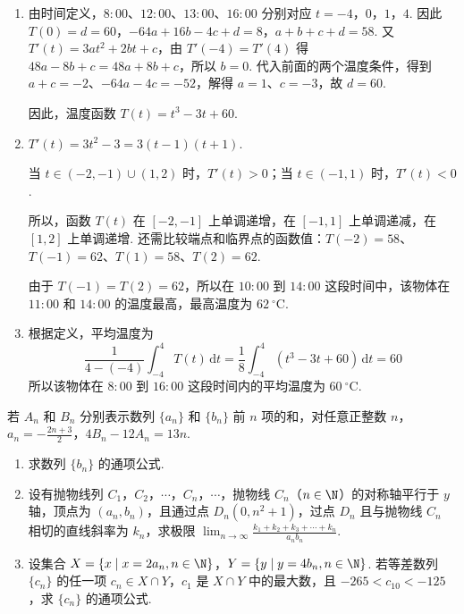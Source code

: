 \begin{solution}
\begin{enumerate}
\item 由时间定义，\(8{:}00\)、\(12{:}00\)、\(13{:}00\)、\(16{:}00\) 分别对应 \(t=-4\)，\(0\)，\(1\)，\(4\). 因此
\(T(0)=d=60\)，\(-64a+16b-4c+d=8\)，\(a+b+c+d=58\). 又 \(T'(t)=3at^2+2bt+c\)，由 \(T'(-4)=T'(4)\) 得 \(48a-8b+c=48a+8b+c\)，所以 \(b=0\). 代入前面的两个温度条件，得到 \(a+c=-2\)、\(-64a-4c=-52\)，解得 \(a=1\)、\(c=-3\)，故 \(d=60\).

因此，温度函数 \(T(t)=t^{3}-3t+60\).

\item \(T'(t)=3t^{2}-3=3(t-1)(t+1)\).

当 \(t\in(-2,-1)\cup(1,2)\) 时，\(T'(t)>0\)；当 \(t\in(-1,1)\) 时，\(T'(t)<0\).

所以，函数 \(T(t)\) 在 \([-2,-1]\) 上单调递增，在 \([-1,1]\) 上单调递减，在 \([1,2]\) 上单调递增. 还需比较端点和临界点的函数值：\(T(-2)=58\)、\(T(-1)=62\)、\(T(1)=58\)、\(T(2)=62\).

由于 \(T(-1)=T(2)=62\)，所以在 \(10{:}00\) 到 \(14{:}00\) 这段时间中，该物体在 \(11{:}00\) 和 \(14{:}00\) 的温度最高，最高温度为 \(62\mathrm{~^{\circ}C}\).

\item 根据定义，平均温度为
\[
\frac{1}{4-(-4)}\int_{-4}^{4}T(t)\,\mathrm{d}t
=\frac{1}{8}\int_{-4}^{4}(t^{3}-3t+60)\,\mathrm{d}t
=60
\]
所以该物体在 \(8{:}00\) 到 \(16{:}00\) 这段时间内的平均温度为 \(60\mathrm{~^{\circ}C}\).
\end{enumerate}
\end{solution}

\begin{problem}
若 \(A_n\) 和 \(B_n\) 分别表示数列 \(\{a_n\}\) 和 \(\{b_n\}\) 前 \(n\) 项的和，对任意正整数 \(n\)，\(a_n = -\frac{2n + 3}{2}\)，\(4B_n - 12A_n = 13n\).

\begin{enumerate}
\item 求数列 \(\{b_n\}\) 的通项公式.
\item 设有抛物线列 \(C_1\)，\(C_2\)，\(\cdots\)，\(C_n\)，\(\cdots\)，抛物线 \(C_n\)（\(n \in \N\)）的对称轴平行于 \(y\) 轴，顶点为 \((a_n, b_n)\)，且通过点 \(D_n(0, n^{2} + 1)\)，过点 \(D_n\) 且与抛物线 \(C_n\) 相切的直线斜率为 \(k_n\)，求极限 \(\displaystyle \lim_{n \to \infty} \frac{k_1 + k_2 + k_3 + \cdots + k_n}{a_n b_n}\).
\item 设集合 \(X = \{x \mid x = 2a_n, n \in \N\}\)，\(Y = \{y \mid y = 4b_n, n \in \N\}\). 若等差数列 \(\{c_n\}\) 的任一项 \(c_n \in X \cap Y\)，\(c_1\) 是 \(X \cap Y\) 中的最大数，且 \(-265 < c_{10} < -125\)，求 \(\{c_n\}\) 的通项公式.
\end{enumerate}
\end{problem}

